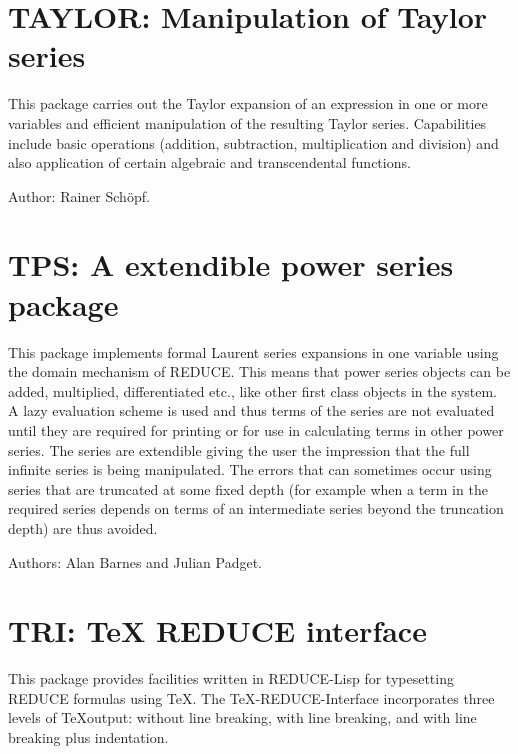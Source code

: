 
\newpage

\section{TAYLOR: Manipulation of Taylor series}

 

This package carries out the Taylor expansion of an expression in one or
more variables and efficient manipulation of the resulting Taylor series.
Capabilities include basic operations (addition, subtraction,
multiplication and division) and also application of certain algebraic and
transcendental functions.

Author: Rainer Sch\"opf.


\newpage

\section{TPS: A extendible power series package} 

This package implements formal Laurent series expansions in one variable
using the domain mechanism of REDUCE.  This means that power series
objects can be added, multiplied, differentiated etc.,  like other first
class objects in the system.  A lazy evaluation scheme is used and thus
terms of the series are not evaluated until they are required for printing
or for use in calculating terms in other power series.  The series are
extendible giving the user the impression that the full infinite series is
being manipulated.  The errors that can sometimes occur using series that
are truncated at some fixed depth (for example when a term in the required
series depends on terms of an intermediate series beyond the truncation
depth) are thus avoided.

Authors:  Alan Barnes and Julian Padget.


\newpage

\section{TRI: TeX REDUCE interface} 

This package provides facilities written in REDUCE-Lisp for typesetting
REDUCE formulas using \TeX.  The \TeX-REDUCE-Interface incorporates three
levels of \TeX output: without line breaking, with line breaking, and
with line breaking plus indentation.

